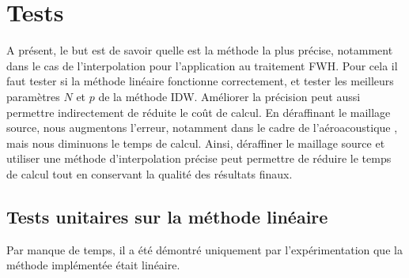 

\section{Tests}
A présent, le but est de savoir quelle est la méthode la plus précise, notamment dans le cas de l'interpolation pour l'application au traitement FWH. Pour cela il faut tester si la méthode linéaire fonctionne correctement, et tester les meilleurs paramètres \(N\) et \(p\) de la méthode IDW.%
Améliorer la précision peut aussi permettre indirectement de réduite le coût de calcul. En déraffinant le maillage source, nous augmentons l'erreur, notamment dans le cadre de l'aéroacoustique \cite{schoder2019}, mais nous diminuons le temps de calcul. Ainsi, déraffiner le maillage source et utiliser une méthode d'interpolation précise peut permettre de réduire le temps de calcul tout en conservant la qualité des résultats finaux. %

\subsection{Tests unitaires sur la méthode linéaire}

Par manque de temps, il a été démontré uniquement par l'expérimentation que la méthode implémentée était linéaire.

